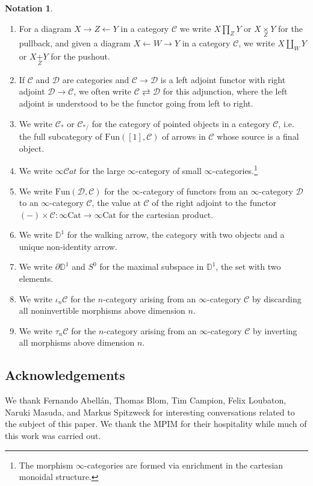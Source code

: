 \documentclass[10pt,oneside]{article}
\numberwithin{equation}{section} %
\numberwithin{figure}{section} %
\theoremstyle{plain}
\theoremstyle{definition}
\newtheorem{notation}[thm]{Notation}
\newcommand{\bD}{{\mathbb D}}
\newcommand{\mC}{{\mathcal C}}
\newcommand{\mD}{{\mathcal D}}
\newcommand{\Cat}{\mathrm{Cat}}
\newcommand{\Fun}{\mathrm{Fun}}
\newcommand{\scat}{\mathcal{C}\mathit{at}}
\begin{document}
\begin{notation}
\begin{enumerate}[\normalfont(1)]
\item For a diagram $X\to Z\leftarrow Y$ in a category $\mC$ we write $X\underset{Z}{\prod} Y$ or $X\underset{Z}{\times} Y$ for the pullback, and given a diagram $X\leftarrow W\to Y$ in a category $\mC$, we write $X\underset{W}{\coprod} Y$ or $X\underset{Z}{+} Y$ for the pushout.
\item If $\mC$ and $\mD$ are categories and $\mC\to\mD$ is a left adjoint functor with right adjoint $\mD\to\mC$, we often write $\mC\rightleftarrows\mD$ for this adjunction, where the left adjoint is understood to be the functor going from left to right.

\item
We write $\mC_*$ or $\mC_{\ast/}$ for the category of pointed objects in a category $\mC$, i.e. the full subcategory of $\Fun([1],\mC)$ of arrows in $\mC$ whose source is a final object.



\item We write $\infty\scat$ for the large $\infty$-category of small $\infty$-categories.\footnote{The morphism $\infty$-categories are formed via enrichment in the cartesian monoidal structure.}
\item We write $\Fun(\mD,\mC)$ for the $\infty$-category of functors from an $\infty$-category $\mD$ to an $\infty$-category $\mC$, the value at $\mC$ of the right adjoint to the functor $(-)\times\mC:\infty\Cat\to\infty\Cat$ for the cartesian product.

\item We write $\bD^1$ for the walking arrow, the category with two objects and a unique non-identity arrow.
\item We write $\partial\bD^1$ and $S^0$ for the maximal subspace in $\bD^1$, the set with two elements.

\item We write $\iota_{n}\mC$ for the $n$-category arising from an $\infty$-category $\mC$ by discarding all noninvertible morphisms above dimension $n.$
\item We write $\tau_{n}\mC$ for the $n$-category arising from an $\infty$-category $\mC$ by inverting all morphisms above dimension $n.$
\end{enumerate}
\end{notation} 

\subsection*{Acknowledgements}
We thank Fernando Abell\'an, Thomas Blom, Tim Campion, Felix Loubaton, Naruki Masuda, and Markus Spitzweck for interesting conversations related to the subject of this paper.
We thank the MPIM for their hospitality while much of this work was carried out.
\end{document}
